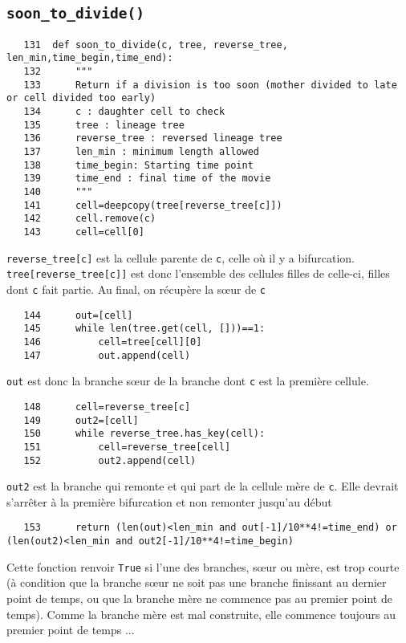 \documentclass{article}
\def \mycolor {red}
\begin{document}
\subsection{\texttt{soon\_to\_divide()}}
\label{sec:soon:to:divide}
\begin{verbatim} 
   131	def soon_to_divide(c, tree, reverse_tree, len_min,time_begin,time_end):
   132	    """
   133	    Return if a division is too soon (mother divided to late or cell divided too early)
   134	    c : daughter cell to check
   135	    tree : lineage tree
   136	    reverse_tree : reversed lineage tree
   137	    len_min : minimum length allowed
   138	    time_begin: Starting time point
   139	    time_end : final time of the movie
   140	    """
   141	    cell=deepcopy(tree[reverse_tree[c]])
   142	    cell.remove(c)
   143	    cell=cell[0]
\end{verbatim} 
\color{\mycolor}
\verb|reverse_tree[c]| est la cellule parente de \verb|c|, celle o\`u il y a bifurcation.  \verb|tree[reverse_tree[c]]| est donc l'ensemble des cellules filles de celle-ci, filles dont \verb|c| fait partie. Au final, on r\'ecup\`ere la s{\oe}ur de  \verb|c|
\color{black}
\begin{verbatim}
   144	    out=[cell]
   145	    while len(tree.get(cell, []))==1:
   146	        cell=tree[cell][0]
   147	        out.append(cell) 
\end{verbatim} 
\color{\mycolor}
\verb|out| est donc la branche s{\oe}ur de la branche dont \verb|c| est la premi\`ere cellule.
\color{black}
\begin{verbatim}
   148	    cell=reverse_tree[c]
   149	    out2=[cell]
   150	    while reverse_tree.has_key(cell):
   151	        cell=reverse_tree[cell]
   152	        out2.append(cell)
\end{verbatim} 
\color{\mycolor}
\verb|out2| est la branche qui remonte et qui part de la cellule m\`ere de \verb|c|. Elle devrait s'arr\^eter \`a la premi\`ere bifurcation et non remonter jusqu'au d\'ebut
\color{black}
\begin{verbatim}
   153	    return (len(out)<len_min and out[-1]/10**4!=time_end) or (len(out2)<len_min and out2[-1]/10**4!=time_begin)
\end{verbatim}
\color{\mycolor}
Cette fonction renvoir \verb|True| si l'une des  branches, s{\oe}ur ou m\`ere, est trop courte (\`a condition que la branche s{\oe}ur ne soit pas une branche finissant au dernier point de temps, ou que la branche m\`ere ne commence pas au premier point de temps). Comme la branche m\`ere est mal construite, elle commence toujours au premier point de temps ...
\color{black}
\end{document}
